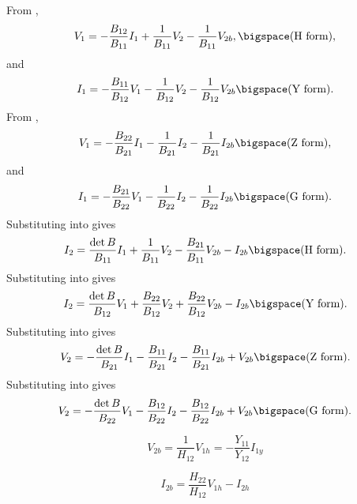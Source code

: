 \documentclass[a4paper, 12pt]{article}
\begin{document}
From ,
%
\begin{equation}
  V_1 = -\frac{B_{12}}{B_{11}} I_1 + \frac{1}{B_{11}} V_2 - \frac{1}{B_{11}} V_{2b},
\bigspace \mbox{(H form)},
\label{eqn:BV1H}
\end{equation}
%
and
%
\begin{equation}
  I_1  =  -\frac{B_{11}}{B_{12}} V_1 - \frac{1}{B_{12}} V_2 - \frac{1}{B_{12}} V_{2b} \bigspace \mbox{(Y form)}.
\label{eqn:BI1Y}
\end{equation}
%
From ,
%
\begin{equation}
  V_1 = -\frac{B_{22}}{B_{21}} I_1 - \frac{1}{B_{21}} I_2  - \frac{1}{B_{21}} I_{2b} \bigspace \mbox{(Z form)},
\label{eqn:BV1Z}
\end{equation}
%
and
%
\begin{equation}
  I_1 = -\frac{B_{21}}{B_{22}} V_1 - \frac{1}{B_{22}} I_2 - \frac{1}{B_{22}} I_{2b}
\bigspace \mbox{(G form)}.
\label{eqn:BI1G}
\end{equation}
%
Substituting  into  gives
%
\begin{equation}
  I_2 = \frac{\det{B}}{B_{11}} I_1 + \frac{1}{B_{11}} V_2 - \frac{B_{21}}{B_{11}} V_{2b} - I_{2b} \bigspace \mbox{(H form)}.
\label{eqn:BI2H}
\end{equation}
%
Substituting  into  gives
%
\begin{equation}
  I_2 = \frac{\det B}{B_{12}} V_1 + \frac{B_{22}}{B_{12}} V_2 + \frac{B_{22}}{B_{12}} V_{2b} - I_{2b} \bigspace \mbox{(Y form)}.
\label{eqn:BI2Y}
\end{equation}
%
Substituting  into  gives
%
\begin{equation}
  V_2 = -\frac{\det B}{B_{21}} I_1 - \frac{B_{11}}{B_{21}} I_2  - \frac{B_{11}}{B_{21}} I_{2b} + V_{2b}  \bigspace \mbox{(Z form)}.
\label{eqn:BV2Z}
\end{equation}
%
Substituting  into  gives
%
\begin{equation}
  V_2 = -\frac{\det B}{B_{22}} V_1 - \frac{B_{12}}{B_{22}} I_2  - \frac{B_{12}}{B_{22}} I_{2b} + V_{2b}  \bigspace \mbox{(G form)}.
\label{eqn:BV2G}
\end{equation}

\begin{equation}
  V_{2b} = \frac{1}{H_{12}} V_{1h} = -\frac{Y_{11}}{Y_{12}} I_{1y}
\end{equation}

\begin{equation}
  I_{2b} = \frac{H_{22}}{H_{12}} V_{1h} - I_{2h}
\end{equation}
\end{document}
